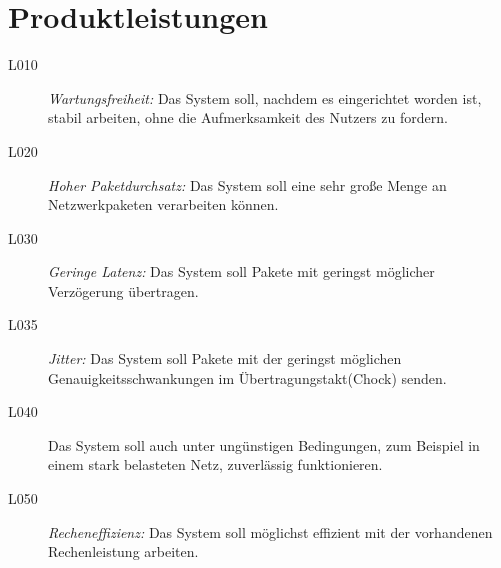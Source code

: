 \section{Produktleistungen}

\begin{description}
	\item[L010]\textit{Wartungsfreiheit:} Das System soll, nachdem es eingerichtet worden ist, stabil arbeiten, ohne die Aufmerksamkeit des Nutzers zu fordern.
	\item[L020]\textit{Hoher Paketdurchsatz:} Das System soll eine sehr große Menge an Netzwerkpaketen verarbeiten können.
	\item[L030]\textit{Geringe Latenz:} Das System soll Pakete mit geringst möglicher Verzögerung übertragen.
	\item[L035]\textit{Jitter:} Das System soll Pakete mit der geringst möglichen Genauigkeitsschwankungen im Übertragungstakt(Chock) senden.
	\item[L040]\textit{} Das System soll auch unter ungünstigen Bedingungen, zum Beispiel in einem stark belasteten Netz, zuverlässig funktionieren.
	\item[L050]\textit{Recheneffizienz:} Das System soll möglichst effizient mit der vorhandenen Rechenleistung arbeiten.	
\end{description}



